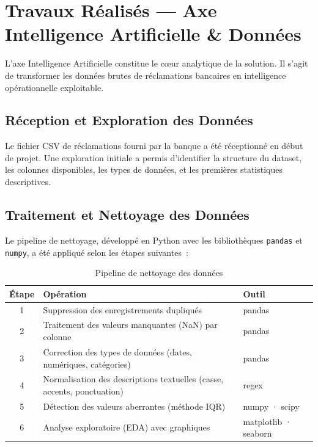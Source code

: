 \documentclass[12pt,a4paper]{report}
\begin{document}
\chapter{Travaux Réalisés --- Axe Intelligence Artificielle \& Données}

L'axe Intelligence Artificielle constitue le c\oe ur analytique de la solution. Il s'agit de transformer les données brutes de réclamations bancaires en intelligence opérationnelle exploitable.

\section{Réception et Exploration des Données}

Le fichier CSV de réclamations fourni par la banque a été réceptionné en début de projet. Une exploration initiale a permis d'identifier la structure du dataset, les colonnes disponibles, les types de données, et les premières statistiques descriptives.

\section{Traitement et Nettoyage des Données}

Le pipeline de nettoyage, développé en Python avec les bibliothèques \texttt{pandas} et \texttt{numpy}, a été appliqué selon les étapes suivantes~:

\begin{table}[H]
\centering
\caption{Pipeline de nettoyage des données}
\begin{tabularx}{\textwidth}{|c|X|l|}
\hline
\textbf{Étape} & \textbf{Opération} & \textbf{Outil} \\
\hline
1 & Suppression des enregistrements dupliqués & pandas \\
\hline
2 & Traitement des valeurs manquantes (NaN) par colonne & pandas \\
\hline
3 & Correction des types de données (dates, numériques, catégories) & pandas \\
\hline
4 & Normalisation des descriptions textuelles (casse, accents, ponctuation) & regex \\
\hline
5 & Détection des valeurs aberrantes (méthode IQR) & numpy · scipy \\
\hline
6 & Analyse exploratoire (EDA) avec graphiques & matplotlib · seaborn \\
\hline
\end{tabularx}
\end{table}
\end{document}
